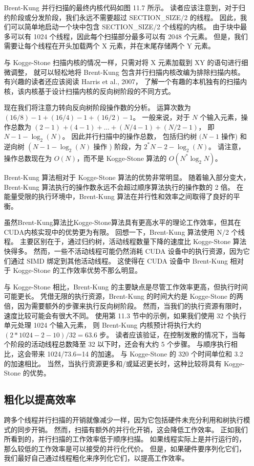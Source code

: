 Brent-Kung 并行扫描的最终内核代码如图 11.7 所示。 
读者应该注意到，对于归约阶段或分发阶段，我们永远不需要超过 SECTION\_SIZE/2 的线程。 
因此，我们可以简单地启动一个块中包含 SECTION\_SIZE/2 个线程的内核。 
由于块中最多可以有 1024 个线程，因此每个扫描部分最多可以有 2048 个元素。 
但是，我们需要让每个线程在开头加载两个 X 元素，并在末尾存储两个 Y 元素。

与 Kogge-Stone 扫描内核的情况一样，只需对将 X 元素加载到 XY 的语句进行细微调整，
就可以轻松地将 Brent-Kung 包含并行扫描内核改编为排除扫描内核。 有兴趣的读者还应该阅读 Harris et al., 2007，
了解一个有趣的本机独有的扫描内核，该内核基于设计扫描内核的反向树阶段的不同方式。

现在我们将注意力转向反向树阶段操作数的分析。 运算次数为$(16 / 8)-1+(16 / 4)-1+(16 / 2)-1$。 
一般来说，对于 $N$ 个输入元素，操作总数为 $(2-1)$ $+(4-1)+\ldots+(N / 4-1)+(N / 2-1)$， 
即 $N-1-\log _{2}(N)$。 因此并行扫描中的操作总数，
包括归约树 $(N-1$ 操作) 和逆向树 $\left(N-1-\log _{2}(N)\right.$ 操作 ) 阶段，为 $2^{*} N-2-\log _{2}(N)$。 
请注意，操作总数现在为 $O(N)$，而不是 Kogge-Stone 算法的 $O\left(N^{*} \log _{2} N\right)$。

Brent-Kung 算法相对于 Kogge-Stone 算法的优势非常明显。 
随着输入部分变大，Brent-Kung 算法执行的操作数永远不会超过顺序算法执行的操作数的 2 倍。 
在能量受限的执行环境中，Brent-Kung 算法在并行性和效率之间取得了良好的平衡。

虽然Brent-Kung算法比Kogge-Stone算法具有更高水平的理论工作效率，但其在CUDA内核实现中的优势更为有限。 
回想一下，Brent-Kung 算法使用 N/2 个线程。 主要区别在于，通过归约树，活动线程数量下降的速度比 Kogge-Stone 算法快得多。 
然而，一些不活动线程可能仍然消耗 CUDA 设备中的执行资源，因为它们通过 SIMD 绑定到其他活动线程。 
这使得在 CUDA 设备中 Brent-Kung 相对于 Kogge-Stone 的工作效率优势不那么明显。

与 Kogge-Stone 相比，Brent-Kung 的主要缺点是尽管工作效率更高，但执行时间可能更长。 
凭借无限的执行资源，Brent-Kung 的时间大约是 Kogge-Stone 的两倍，因为需要额外的步骤来执行反向树阶段。 
然而，当我们的执行资源有限时，速度比较可能会有很大不同。 
使用第 11.3 节中的示例，如果我们使用 32 个执行单元处理 1024 个输入元素，
则 Brent-Kung 内核预计将执行大约 $(2 * 1024-2-10) / 32=63.6$ 步。 
读者应该验证，在控制发散的情况下，当每个阶段的活动线程总数降至 32 以下时，还会有大约 5 个步骤。 
与顺序执行相比，这会带来 1024/73.6=14 的加速。 与 Kogge-Stone 的 320 个时间单位和 3.2 的加速相比。 
当然，当执行资源更多和/或延迟更长时，这种比较将具有 Kogge-Stone 的优势。

\subsection{粗化以提高效率}
跨多个线程并行扫描的开销就像减少一样，因为它包括硬件未充分利用和树执行模式的同步开销。 
然而，扫描有额外的并行化开销，这会降低工作效率。 正如我们所看到的，并行扫描的工作效率低于顺序扫描。 
如果线程实际上是并行运行的，那么较低的工作效率是可以接受的并行化代价。 
但是，如果硬件要序列化它们，我们最好自己通过线程粗化来序列化它们，以提高工作效率。

